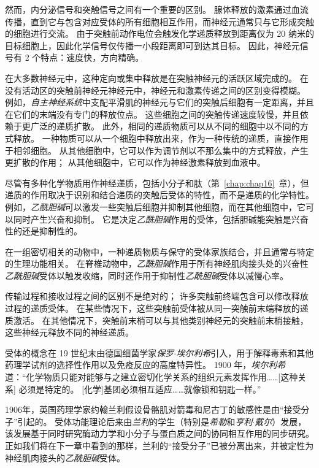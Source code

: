 然而，内分泌信号和突触信号之间有一个重要的区别。
腺体释放的激素通过血流传播，直到它与包含对应受体的所有细胞相互作用，而神经元通常只与它形成突触的细胞进行交流。
由于突触前动作电位会触发化学递质释放到距离仅为 20 纳米的目标细胞上，因此化学信号仅传播一小段距离即可到达其目标。 
因此，神经元信号有 2 个特点：速度快，方向精确。


在大多数神经元中，这种定向或集中释放是在突触神经元的活跃区域完成的。
在没有活动区的突触前神经元神经元中，神经元和激素传递之间的区别变得模糊。
例如，\textit{自主神经系统}中支配平滑肌的神经元与它们的突触后细胞有一定距离，并且在它们的末端没有专门的释放位点。
这些细胞之间的突触传递速度较慢，并且依赖于更广泛的递质扩散。
此外，相同的递质物质可以从不同的细胞中以不同的方式释放。
一种物质可以从一个细胞中释放出来，作为一种传统的递质，直接作用于相邻细胞。
从其他细胞中，它可以作为调节剂以不那么集中的方式释放，产生更扩散的作用；
从其他细胞中，它可以作为神经激素释放到血液中。


尽管有多种化学物质用作神经递质，包括小分子和肽（第~\ref{chap:chap16}~章），但递质的作用取决于识别和结合递质的突触后受体的特性，而不是递质的化学特性。
例如，\textit{乙酰胆碱}可以激发一些突触后细胞并抑制其他细胞，而在其他细胞中，它可以同时产生兴奋和抑制。
它是决定\textit{乙酰胆碱}作用的受体，包括胆碱能突触是兴奋性的还是抑制性的。


在一组密切相关的动物中，一种递质物质与保守的受体家族结合，并且通常与特定的生理功能相关。
在脊椎动物中，\textit{乙酰胆碱}作用于所有神经肌肉接头处的兴奋性\textit{乙酰胆碱}受体以触发收缩，同时还作用于抑制性\textit{乙酰胆碱}受体以减慢心率。


传输过程和接收过程之间的区别不是绝对的；
许多突触前终端包含可以修改释放过程的递质受体。
在某些情况下，这些突触前受体被从同一突触前末端释放的递质激活。
在其他情况下，突触前末梢可以与其他类别神经元的突触前末梢接触，这些神经元释放不同的神经递质。


受体的概念在 19 世纪末由德国细菌学家\textit{保罗$\cdot$埃尔利希}引入，用于解释毒素和其他药理学试剂的选择性作用以及免疫反应的高度特异性。
1900 年，\textit{埃尔利希}道：“化学物质只能对能够与之建立密切化学关系的组织元素发挥作用……[这种关系] 必须是特定的。
[化学]基团必须相互适应……就像锁和钥匙一样。”


1906年，英国药理学家约翰兰利假设骨骼肌对箭毒和尼古丁的敏感性是由“接受分子”引起的。
受体功能理论后来由\textit{兰利}的学生（特别是\textit{希勒}和\textit{亨利$\cdot$戴尔}）发展，该发展基于同时研究酶动力学和小分子与蛋白质之间的协同相互作用的同步研究。
正如我们将在下一章中看到的那样，兰利的“接受分子”已被分离出来，并被定性为神经肌肉接头的\textit{乙酰胆碱}受体。


